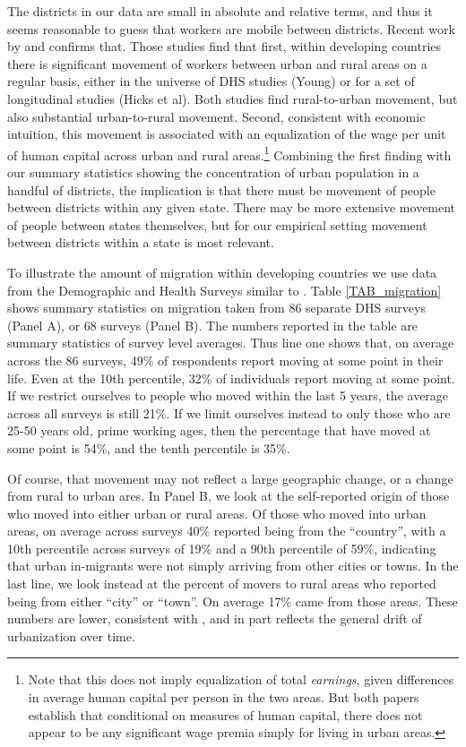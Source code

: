 \documentclass[11pt]{article}
\begin{document}
The districts in our data are small in absolute and relative terms, and thus it seems reasonable to guess that workers are mobile between districts. Recent work by \cite{young2013inequality} and \cite{hklm2017} confirms that. Those studies find that first, within developing countries there is significant movement of workers between urban and rural areas on a regular basis, either in the universe of DHS studies (Young) or for a set of longitudinal studies (Hicks et al). Both studies find rural-to-urban movement, but also substantial urban-to-rural movement. Second, consistent with economic intuition, this movement is associated with an equalization of the wage per unit of human capital across urban and rural areas.\footnote{Note that this does not imply equalization of total \textit{earnings}, given differences in average human capital per person in the two areas. But both papers establish that conditional on measures of human capital, there does not appear to be any significant wage premia simply for living in urban areas.} Combining the first finding with our summary statistics showing the concentration of urban population in a handful of districts, the implication is that there must be movement of people between districts within any given state. There may be more extensive movement of people between states themselves, but for our empirical setting movement between districts within a state is most relevant.

To illustrate the amount of migration within developing countries we use data from the Demographic and Health Surveys \citep{DHS} similar to \cite{young2013inequality}. Table \ref{TAB_migration} shows summary statistics on migration taken from 86 separate DHS surveys (Panel A), or 68 surveys (Panel B). The numbers reported in the table are summary statistics of survey level averages. Thus line one shows that, on average across the 86 surveys, 49\% of respondents report moving at some point in their life. Even at the 10th percentile, 32\% of individuals report moving at some point. If we restrict ourselves to people who moved within the last 5 years, the average across all surveys is still 21\%. If we limit ourselves instead to only those who are 25-50 years old, prime working ages, then the percentage that have moved at some point is 54\%, and the tenth percentile is 35\%.

Of course, that movement may not reflect a large geographic change, or a change from rural to urban ares. In Panel B, we look at the self-reported origin of those who moved into either urban or rural areas. Of those who moved into urban areas, on average across surveys 40\% reported being from the ``country'', with a 10th percentile across surveys of 19\% and a 90th percentile of 59\%, indicating that urban in-migrants were not simply arriving from other cities or towns. In the last line, we look instead at the percent of movers to rural areas who reported being from either ``city'' or ``town''. On average 17\% came from those areas. These numbers are lower, consistent with \cite{young2013inequality}, and in part reflects the general drift of urbanization over time.
\end{document}

